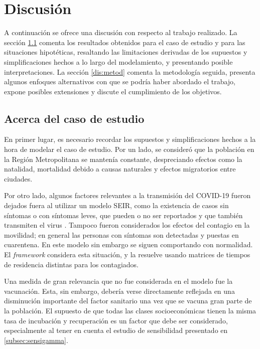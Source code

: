 \chapter{Discusión} \label{chap:discus}

A continuación se ofrece una discusión con respecto al trabajo realizado. La sección \ref{dis:caso} comenta los resultados obtenidos para el caso de estudio y para las situaciones hipotéticas, resaltando las limitaciones derivadas de los supuestos y simplificaciones hechos a lo largo del modelamiento, y presentando posible interpretaciones. La sección \ref{dis:metod} comenta la metodología seguida, presenta algunos enfoques alternativos con que se podría haber abordado el trabajo, expone posibles extensiones y discute el cumplimiento de los objetivos.

\section{Acerca del caso de estudio}\label{dis:caso}

En primer lugar, es necesario recordar los supuestos y simplificaciones hechos a la hora de modelar el caso de estudio. Por un lado, se consideró que la población en la Región Metropolitana se mantenía constante, despreciando efectos como la natalidad, mortalidad debido a causas naturales y efectos migratorios entre ciudades.

Por otro lado, algunos factores relevantes a la transmisión del COVID-19 fueron dejados fuera al utilizar un modelo SEIR, como la existencia de casos sin síntomas o con síntomas leves, que pueden o no ser reportados y que también transmiten el virus \cite{Li2020c}\cite{Byambasuren2020}\cite{Gao2021}. Tampoco fueron considerados los efectos del contagio en la movilidad; en general las personas con síntomas son detectadas y puestas en cuarentena. En este modelo sin embargo se siguen comportando con normalidad. El \textit{framework} \cite{Bichara2018} considera esta situación, y la resuelve usando matrices de tiempos de residencia distintas para los contagiados.

Una medida de gran relevancia que no fue considerada en el modelo fue la vacunación. Esta, sin embargo, debería verse directamente reflejada en una disminución importante del factor sanitario una vez que se vacuna gran parte de la población. El supuesto de que todas las clases socioeconómicas tienen la misma tasa de incubación y recuperación es un factor que debe ser considerado, especialmente al tener en cuenta el estudio de sensibilidad presentado en \ref{subsec:sensigamma}.

